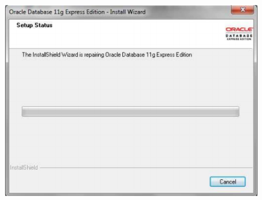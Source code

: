 \documentclass[12pt,letterpaper]{article}
\begin{document}
\begin{center}
\includegraphics[width=15cm]{./IMG/img3}
\end{center} 
\end{document}
